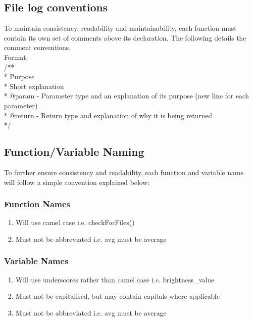 \documentclass[a4paper,12pt]{article}
\begin{document}
\subsection{File log conventions}
To maintain consistency, readability and maintainability, each function must contain its own set of comments above its declaration. The following details the comment conventions.\\

Format:\\
/**\\
\hspace*{1.5pt} \** Purpose\\
\hspace*{1.5pt} \** Short explanation\\
\hspace*{1.5pt} \** @param - Parameter type and an explanation of its purpose (new line for each parameter)\\
\hspace*{1.5pt} \** @return - Return type and explanation of why it is being returned\\
\hspace*{1.5pt} \**/


\newpage
\subsection{Function/Variable Naming}
To further ensure consistency and readability, each function and variable name will follow a simple convention explained below:

\subsubsection{Function Names}
\begin{enumerate}
\item Will use camel case i.e. checkForFiles()
\item Must not be abbreviated i.e. avg must be average
\end{enumerate}

\subsubsection{Variable Names}
\begin{enumerate}
\item Will use underscores rather than camel case i.e. brightness\_value
\item Must not be capitalised, but may contain capitals where applicable
\item Must not be abbreviated i.e. avg must be average
\end{enumerate}
\end{document}
